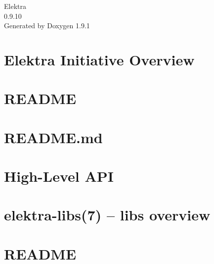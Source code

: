 \let\mypdfximage\pdfximage\def\pdfximage{\immediate\mypdfximage}\documentclass[twoside]{book}
\newcommand{\+}{\discretionary{\mbox{\scriptsize$\hookleftarrow$}}{}{}}
\newcommand{\clearemptydoublepage}{%
  \newpage{\pagestyle{empty}\cleardoublepage}%
}
\begin{document}
\raggedbottom

\hypersetup{pageanchor=false,
             bookmarksnumbered=true,
             pdfencoding=unicode
            }
\begin{titlepage}
\vspace*{7cm}
\begin{center}%
{\Large Elektra \\[1ex]\large 0.\+9.\+10 }\\
\vspace*{1cm}
{\large Generated by Doxygen 1.9.1}\\
\end{center}
\end{titlepage}
\clearemptydoublepage
{}
\tableofcontents
\clearemptydoublepage
{}
\hypersetup{pageanchor=true}

\chapter{Elektra Initiative Overview}
\label{index}\hypertarget{index}{}
\chapter{README}
\label{md_src_libs_elektra_README}

\chapter{README.\+md}
\label{src_libs_getenv_README_md}

\chapter{High-\/\+Level API}
\label{src_libs_highlevel_README_md}

\chapter{elektra-\/libs(7) -- libs overview}
\label{src_libs_README_md}

\chapter{README}
\label{md_src_bindings_io_doc_README}

\end{document}
